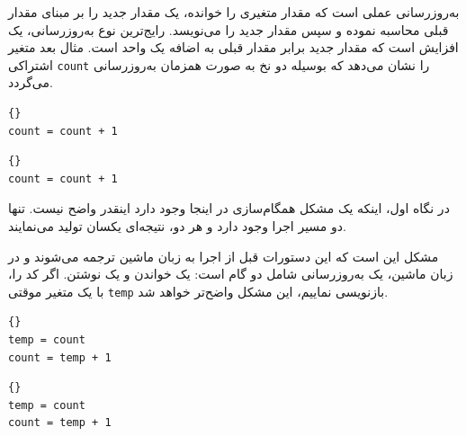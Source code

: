 \documentclass{book}
\begin{document}
    به‌روزرسانی عملی است که مقدار متغیری را خوانده، یک مقدار جدید را بر مبنای مقدار قبلی محاسبه نموده و سپس مقدار جدید را می‌نویسد. 
    رایج‌ترین نوع به‌روزرسانی، یک افزایش  است که مقدار جدید برابر مقدار قبلی به اضافه یک واحد است. 
    مثال بعد متغیر اشتراکی \texttt{count} را نشان می‌دهد که بوسیله دو نخ به صورت همزمان به‌روزرسانی می‌گردد. 

\begin{latin}
\begin{minipage}[t]{2in}
\begin{latin}
\begin{lstlisting}[title=\rl{نخ \lr{A}}]{}
count = count + 1
\end{lstlisting}
\end{latin}
\end{minipage}
\hfill
\begin{minipage}[t]{2in}
\begin{latin}
\begin{lstlisting}[title=\rl{نخ \lr{B}}]{}
count = count + 1
\end{lstlisting}
\end{latin}
\end{minipage}
\end{latin}

    در نگاه اول، اینکه یک مشکل همگام‌سازی در اینجا وجود دارد اینقدر واضح نیست. 
    تنها دو مسیر اجرا وجود دارد و هر دو، نتیجه‌ای یکسان تولید می‌نمایند. 
    
    مشکل این است که این دستورات قبل از اجرا به زبان ماشین ترجمه می‌شوند و در زبان ماشین، یک به‌روزرسانی شامل دو گام است: یک خواندن 
    و یک نوشتن. اگر کد را، با یک متغیر موقتی \texttt{temp} بازنویسی نماییم، این مشکل واضح‌تر خواهد شد. 

\begin{latin}
\begin{minipage}[t]{2in}
\begin{latin}
\begin{lstlisting}[title=\rl{نخ \lr{A}}]{}
temp = count
count = temp + 1
\end{lstlisting}
\end{latin}
\end{minipage}
\hfill
\begin{minipage}[t]{2in}
\begin{latin}
\begin{lstlisting}[title=\rl{نخ \lr{B}}]{}
temp = count
count = temp + 1
\end{lstlisting}
\end{latin}
\end{minipage}
\end{latin}
\end{document}
